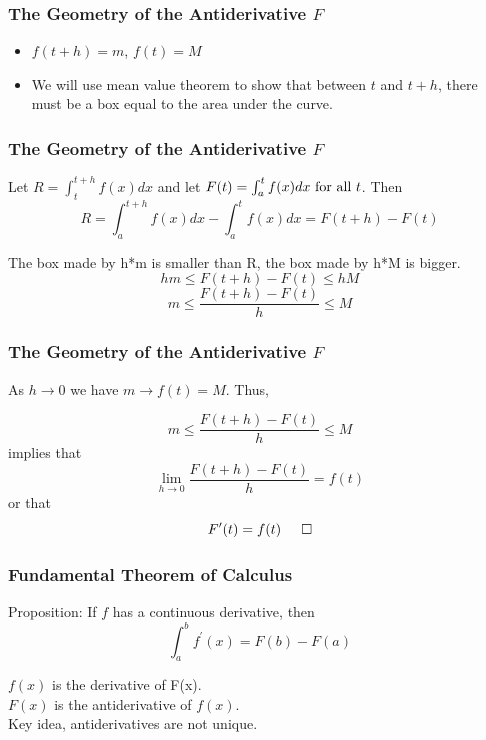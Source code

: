 \documentclass[handout]{beamer}
\numberwithin{equation}{section}
\begin{document}
\begin{frame}
\frametitle{The Geometry of the Antiderivative $F$}

\begin{center}
\end{center}
\begin{itemize}
\item $f(t+h)=m$, $f(t)=M$
\item We will use mean value theorem to show that between $t$ and $t+h$, there must be a box equal to the area under the curve.
\end{itemize}
\end{frame}







\begin{frame}
\frametitle{The Geometry of the Antiderivative $F$}

\begin{center}
\end{center}
Let $R=\int_t^{t+h}f(x) dx$ and let $F(t)=\int_a^t f(x) dx \hbox{ for all } t$. \pause Then $$R=\int_a^{t+h}f(x)dx-\int_a^{t}f(x)dx=F(t+h)-F(t)$$ \pause

The box made by h*m is smaller than R, the box made by h*M is bigger.
$$ hm\leq F(t+h)-F(t)\leq hM$$\pause
$$m\leq \frac{F(t+h)-F(t)}{h}\leq M$$ 

\end{frame}




\begin{frame}
\frametitle{The Geometry of the Antiderivative $F$}

\begin{center}
\end{center}

As $h\rightarrow 0$ we have $m\rightarrow f(t)=M$. \pause Thus,

$$m\leq \frac{F(t+h)-F(t)}{h}\leq M$$ \pause implies that $$\lim_{h\rightarrow 0} \frac{F(t+h)-F(t)}{h} =f(t)$$
or that $$F^\prime(t)=f(t) \hspace{.2in }\Box$$

\end{frame}



\begin{frame}
\frametitle{Fundamental Theorem of Calculus}

\begin{theorem}
Proposition: If $f$ has a continuous derivative, then $$\int_a^b f^\prime(x)=F(b)-F(a)$$
\end{theorem} \pause

$f(x)$ is the derivative of F(x).\\
$F(x)$ is the antiderivative of $f(x)$.\\
Key idea, antiderivatives are not unique.
\end{frame}
\end{document}
